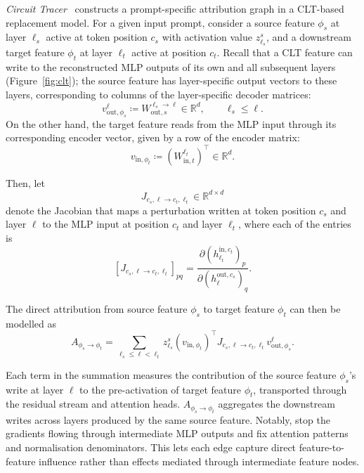 \begin{definitionbox}
\label{def:circuit-tracer}

\emph{Circuit Tracer}~ constructs a prompt-specific attribution graph in a CLT-based replacement model. For a given input prompt, consider a source feature $\phi_s$ at layer $\ell_s$ active at token position $c_s$ with activation value $z_{\ell_s}^{s}$, and a downstream target feature $\phi_t$ at layer $\ell_t$ active at position $c_t$. Recall that a CLT feature can write to the reconstructed MLP outputs of its own and all subsequent layers (Figure~\ref{fig:clt}); the source feature has layer-specific output vectors to these layers, corresponding to columns of the layer-specific decoder matrices:
\[
v_{\mathrm{out},\phi_s}^{\ell}
\coloneqq
W_{\mathrm{out},s}^{\ell_s \to \ell}
\in \mathbb{R}^{d},
\qquad
\ell_s \leq \ell.
\]
On the other hand, the target feature reads from the MLP input through its corresponding encoder vector, given by a row of the encoder matrix:
\[
v_{\mathrm{in},\phi_t}
\coloneqq
\left(W_{\mathrm{in},t}^{\ell_t}\right)^\top
\in \mathbb{R}^{d}.
\]

Then, let
\[
J_{c_s,\ell \to c_t,\ell_t}
\in \mathbb{R}^{d\times d}
\]
denote the Jacobian that maps a perturbation written at token position $c_s$ and layer $\ell$ to the MLP input at position $c_t$ and layer $\ell_t$, where each of the entries is
\[
\left[
J_{c_s,\ell \to c_t,\ell_t}
\right]_{pq}
=
\frac{
\partial \left(h_{\ell_t}^{\mathrm{in},c_t}\right)_p
}{
\partial \left(h_{\ell}^{\mathrm{out},c_s}\right)_q
}.
\]

The direct attribution from source feature $\phi_s$ to target feature $\phi_t$ can then be modelled as
\[
A_{\phi_s \rightarrow \phi_t}
=
\sum_{\ell_s \leq \ell < \ell_t}
z_{\ell_s}^{s}
\left(v_{\mathrm{in},\phi_t}\right)^\top
J_{c_s,\ell \to c_t,\ell_t}
v_{\mathrm{out},\phi_s}^{\ell}.
\]

Each term in the summation measures the contribution of the source feature $\phi_s$’s write at layer $\ell$ to the pre-activation of target feature $\phi_t$, transported through the residual stream and attention heads. $A_{\phi_s \rightarrow \phi_t}$ aggregates the downstream writes across layers produced by the same source feature. Notably,  stop the gradients flowing through intermediate MLP outputs and fix attention patterns and normalisation denominators. This lets each edge capture direct feature-to-feature influence rather than effects mediated through intermediate feature nodes.

\end{definitionbox}

